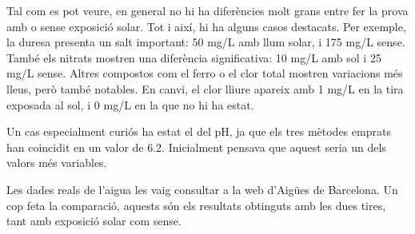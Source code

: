 Tal com es pot veure, en general no hi ha diferències molt grans entre fer la prova amb o sense exposició solar. Tot i així, hi ha alguns casos destacats. Per exemple, la duresa presenta un salt important: 50 mg/L amb llum solar, i 175 mg/L sense. També els nitrats mostren una diferència significativa: 10 mg/L amb sol i 25 mg/L sense. Altres compostos com el ferro o el clor total mostren variacions més lleus, però també notables. En canvi, el clor lliure apareix amb 1 mg/L en la tira exposada al sol, i 0 mg/L en la que no hi ha estat.

Un cas especialment curiós ha estat el del pH, ja que els tres mètodes emprats han coincidit en un valor de 6.2. Inicialment pensava que aquest seria un dels valors més variables.

Les dades reals de l’aigua les vaig consultar a la web d’Aigües de Barcelona. Un cop feta la comparació, aquests són els resultats obtinguts amb les dues tires, tant amb exposició solar com sense.

